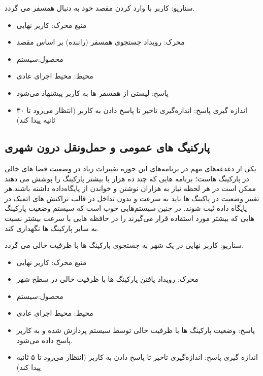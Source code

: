 سناریو: کاربر با وارد کردن مقصد خود به دنبال همسفر می گردد. 
\begin{itemize}
\item
منبع محرک: کاربر نهایی
\item
محرک: رویداد جستجوی همسفر (راننده) بر اساس مقصد
\item
محصول:سیستم
\item
محیط: محیط اجرای عادی
\item
پاسخ: لیستی از همسفر ها به کاربر پیشنهاد می‌شود
\item
اندازه گیری پاسخ: اندازه‌گیری تاخیر تا پاسخ دادن به کاربر (انتظار می‌رود تا ۳۰ ثانیه پیدا کند)
\end{itemize}



\subsection{پارکنیگ های عمومی و حمل‌و‌نقل درون شهری}
یکی از دغدغه‌های مهم در برنامه‌های این حوزه تغییرات زیاد در وضعیت فضا های خالی در پارکینگ هاست؛ برنامه هایی که چند ده هزار یا بیشتر پارکینگ را پوشش می دهند ممکن است در هر لحظه نیاز به هزاران نوشتن و خواندن از پایگاه‌داده داشته باشند.هر تغییر وضعیت در پاکینگ ها باید به سرعت و بدون تداخل در قالب تراکنش های اتمیک در پایگاه داده ثبت شوند.
در چنین سیستم‌هایی خوب است که سیستم وضعیت پارکینگ هایی که بیشتر مورد استفاده قرار می‌گیرند را در حافظه هایی با سرعت بیشتر نسبت به سایر پارکینگ ها نگهداری کند.

سناریو: کاربر نهایی در یک شهر به جستجوی پارکینگ ها با ظرفیت خالی می گردد.
\begin{itemize}
\item
منبع محرک: کاربر نهایی
\item
محرک: رویداد یافتن پارکینگ ها با ظرفیت خالی در سطح شهر
\item
محصول:سیستم
\item
محیط: محیط اجرای عادی
\item
پاسخ: وضعیت پارکینگ ها با ظرفیت خالی توسط سیستم پردازش شده و به کاربر پاسخ داده می‌شود.
\item
اندازه گیری پاسخ: اندازه‌گیری تاخیر تا پاسخ دادن به کاربر (انتظار می‌رود تا ۵ ثانیه پیدا کند)
\end{itemize}

